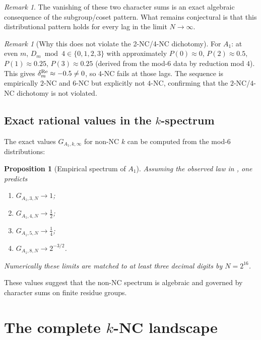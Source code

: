 \documentclass[11pt]{article}
\newtheorem{proposition}[theorem]{Proposition}
\theoremstyle{definition}
\theoremstyle{remark}
\newtheorem{remark}[theorem]{Remark}
\begin{document}
\begin{remark}
The vanishing of these two character sums is an exact algebraic
consequence of the subgroup/coset pattern.  What remains conjectural is
that this distributional pattern holds for every lag in the limit
$N\to\infty$.
\end{remark}

\begin{remark}[Why this does not violate the 2-NC/4-NC dichotomy]
For $A_1$: at even $m$, $D_m \bmod 4 \in \{0, 1, 2, 3\}$
with approximately $P(0) \approx 0$, $P(2)\approx 0.5$,
$P(1)\approx 0.25$, $P(3)\approx 0.25$
(derived from the mod-$6$ data by reduction mod $4$).  This gives
$\delta^{\rm Re}_m \approx -0.5 \neq 0$, so $4$-NC fails at
those lags.  The sequence is empirically $2$-NC and $6$-NC but explicitly not
$4$-NC, confirming that the $2$-NC/$4$-NC dichotomy is not violated.
\end{remark}

\subsection{Exact rational values in the $k$-spectrum}

The exact values $G_{A_1, k, \infty}$ for non-NC $k$ can be computed
from the mod-$6$ distributions:

\begin{proposition}[Empirical spectrum of $A_1$]
\label{prop:exact_spectrum}
Assuming the observed law in , one predicts
\begin{enumerate}
  \item $G_{A_1,3,N}\to 1$;
  \item $G_{A_1,4,N}\to \tfrac12$;
  \item $G_{A_1,5,N}\to \tfrac14$;
  \item $G_{A_1,8,N}\to 2^{-3/2}$.
\end{enumerate}
Numerically these limits are matched to at least three decimal digits
by $N=2^{16}$.
\end{proposition}

These values suggest that the non-NC spectrum is algebraic and governed
by character sums on finite residue groups.

\section{The complete $k$-NC landscape}
\label{sec:landscape}
\end{document}
